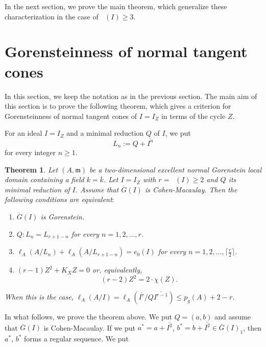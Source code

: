 \documentclass[12pt]{amsart}
\newtheorem{thm}{Theorem}[section]
\theoremstyle{definition}
\theoremstyle{remark}
\numberwithin{equation}{section}
\DeclareMathOperator{\br}{\bar r}
\newcommand{\m}{\mathfrak m}
\renewcommand{\:}{\colon}
\begin{document}
\par \vspace{2mm}
In the next section, we prove the main theorem, which generalize these characterization 
in the case of $\br(I) \ge 3$. 





\section{Gorensteinness of normal tangent cones}

In this section, we keep the notation as in the previous section. 
The main aim of this section is to prove the following theorem, 
which gives a criterion for Gorensteinness of normal tangent cones 
 of $I=I_Z$ in terms of the cycle $Z$.

\par \vspace{2mm}
For an ideal $I=I_Z$ and a minimal reduction $Q$ of $I$, 
we put 
\[
L_n:=Q+\overline{I^n} 
\]
for every integer $n \ge 1$. 

\begin{thm} \label{Main}
Let $(A,\m)$ be a two-dimensional excellent normal Gorenstein local 
domain containing a field $k=\overline{k}$. 
Let $I=I_Z$ with $r=\br(I) \ge 2$ and $Q$ its minimal reduction of $I$. 
Assume that $\overline{G}(I)$ is Cohen-Macaulay. 
Then the following conditions are equivalent$:$
\begin{enumerate}
\item $\overline{G}(I)$ is Gorenstein. 
\item 
$Q \colon L_n=L_{r+1-n}$ for every $n=1,2,\ldots, r$. 
\item
$\ell_A(A/L_n)+\ell_A(A/L_{r+1-n})=e_0(I)$ for  every $n=1,2,\ldots,\lceil \frac{r}{2} \rceil$. 
\item $(r-1)Z^2+K_XZ=0$  or, equivalently, 
\[
(r-2) Z^2 = 2 \cdot \chi(Z).
\] 
\end{enumerate}
When this is the case, 
$\ell_A(A/I) = \ell_A(\overline{I^{r}}/Q\overline{I^{r-1}}) 
\le p_g(A)+2-r$.   
\end{thm}

\par \vspace{3mm}
In what follows, we prove the theorem above. 
We put $Q=(a,b)$ and 
assume that $\overline{G}(I)$ is Cohen-Macaulay. 
If we put $a^{*}=a+\overline{I^2}$, 
$b^{*}=b+\overline{I^2} \in \overline{G}(I)_1$, 
then $a^{*}$, $b^{*}$ forms a regular sequence. 
We put 
\end{document}
